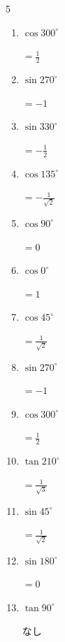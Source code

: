\begin{multicols}{5}
\begin{enumerate}
        $\displaystyle =0$

  \item $\displaystyle \cos{300^\circ}$

        $\displaystyle =\frac{1}{2}$

  \item $\displaystyle \sin{270^\circ}$

        $\displaystyle =-1$

  \item $\displaystyle \sin{330^\circ}$

        $\displaystyle =-\frac{1}{2}$

  \item $\displaystyle \cos{135^\circ}$

        $\displaystyle =-\frac{1}{\sqrt{2}}$

  \item $\displaystyle \cos{90^\circ}$

        $\displaystyle =0$

  \item $\displaystyle \cos{0^\circ}$

        $\displaystyle =1$

  \item $\displaystyle \cos{45^\circ}$

        $\displaystyle =\frac{1}{\sqrt{2}}$

  \item $\displaystyle \sin{270^\circ}$

        $\displaystyle =-1$

  \item $\displaystyle \cos{300^\circ}$

        $\displaystyle =\frac{1}{2}$

  \item $\displaystyle \tan{210^\circ}$

        $\displaystyle =\frac{1}{\sqrt{3}}$

  \item $\displaystyle \sin{45^\circ}$

        $\displaystyle =\frac{1}{\sqrt{2}}$

  \item $\displaystyle \sin{180^\circ}$

        $\displaystyle =0$

  \item $\displaystyle \tan{90^\circ}$

        $\displaystyle なし$

\end{enumerate}
\end{multicols}
